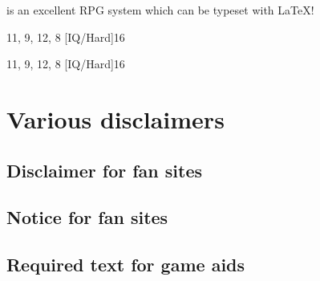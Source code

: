\documentclass{article}
\begin{document}
\gurps is an excellent RPG system which can be typeset with \LaTeX{}!

\begin{character}{11, 9, 12, 8}
  [IQ/Hard]{16}
\end{character}

\begin{lens}{11, 9, 12, 8}
  [IQ/Hard]{16}
\end{lens}

\section{Various disclaimers}
\label{sec:various-disclaimers}

\subsection{Disclaimer for fan sites}
\label{sec:disclaimer-fan-sites}

\SJGamesOnlinePolicyDisclaimer

\subsection{Notice for fan sites}
\label{sec:disclaimer-fan-sites}

\SJGamesOnlinePolicyNotice

\subsection{Required text for game aids}
\label{sec:disclaimer-fan-sites}

\end{document}
